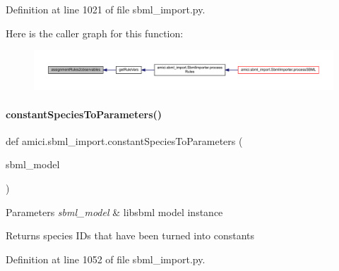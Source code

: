 Definition at line 1021 of file sbml\+\_\+import.\+py.

Here is the caller graph for this function\+:
\nopagebreak
\begin{figure}[H]
\begin{center}
\leavevmode
\includegraphics[width=350pt]{namespaceamici_1_1sbml__import_aaba72ac8b7d363e7720f36495ccc3285_icgraph}
\end{center}
\end{figure}
\mbox{\label{namespaceamici_1_1sbml__import_a9cee719122a45a0ac8590514a19ed5cc}} 
\paragraph{\texorpdfstring{constant\+Species\+To\+Parameters()}{constantSpeciesToParameters()}}
{\footnotesize\ttfamily def amici.\+sbml\+\_\+import.\+constant\+Species\+To\+Parameters (\begin{DoxyParamCaption}\item[{}]{sbml\+\_\+model }\end{DoxyParamCaption})}


\begin{DoxyParams}{Parameters}
{\em sbml\+\_\+model} & libsbml model instance\\
\hline
\end{DoxyParams}
\begin{DoxyReturn}{Returns}
species I\+Ds that have been turned into constants 
\end{DoxyReturn}


Definition at line 1052 of file sbml\+\_\+import.\+py.

\mbox{\label{namespaceamici_1_1sbml__import_a178c633ce1bc7f2af378ce56bd404541}} 
